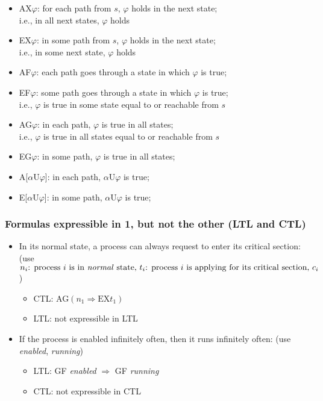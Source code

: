 \documentclass[10pt,a4paper]{article}
\theoremstyle{definition}
\begin{document}
\begin{itemize}
	\item AX$\varphi$: for each path from $s$, $\varphi$ holds in the next state; \\
	 i.e., in all next states, $\varphi$ holds
	\item EX$\varphi$: in some path from $s$, $\varphi$ holds in the next state; \\
	 i.e., in some next state, $\varphi$ holds
	\item AF$\varphi$: each path goes through a state in which $\varphi$ is true;
	\item EF$\varphi$: some path goes through a state in which $\varphi$ is true; \\
	 i.e., $\varphi$ is true in some state equal to or reachable from $s$
	\item AG$\varphi$: in each path, $\varphi$ is true in all states; \\
	 i.e., $\varphi$ is true in all states equal to or reachable from $s$
	 \item EG$\varphi$: in some path, $\varphi$ is true in all states;
	 \item A[$\alpha \text{U}\varphi$]: in each path, $\alpha \text{U}\varphi$ is true;
	 \item E[$\alpha \text{U}\varphi$]: in some path, $\alpha \text{U}\varphi$ is true;
\end{itemize}

\subsubsection{Formulas expressible in 1, but not the other (LTL and CTL)}

\begin{itemize}
	\item In its normal state, a process can always request to enter its critical section: (use $n_i \text{: process $i$ is in \textit{normal} state, } t_i \text{: process $i$ is applying for its critical section, } c_i$) 
	\begin{itemize}
		\item CTL: AG$(n_1 \Rightarrow \text{EX} t_1)$
		\item LTL: not expressible in LTL
	\end{itemize}
	\item If the process is enabled infinitely often, then it runs infinitely often: (use \textit{enabled}, \textit{running})
	\begin{itemize}
		\item LTL: GF \textit{enabled} $\Rightarrow$ GF \textit{running}
		\item CTL: not expressible in CTL
	\end{itemize}
\end{itemize}
\end{document}
